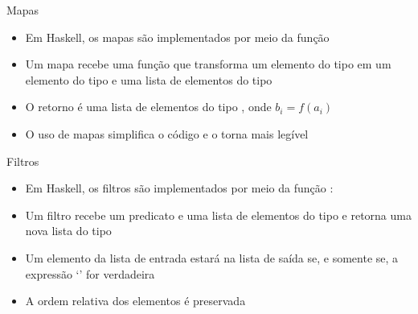 \begin{frame}[fragile]{Mapas}

    \begin{itemize}
        \item Em Haskell, os mapas são implementados por meio da função 
        
        
        \item Um mapa recebe uma função  que transforma um elemento do tipo 
             em um elemento do tipo  e uma lista de elementos
            do tipo 

        \item O retorno é uma lista de elementos do tipo , onde
            $b_i = f(a_i)$
        
        \item O uso de mapas simplifica o código e o torna mais legível
 
    \end{itemize}

\end{frame}

\begin{frame}[fragile]{Filtros}

    \begin{itemize}
        \item Em Haskell, os filtros são implementados por meio da função :


        \item Um filtro recebe um predicato  e uma lista de elementos do tipo
             e retorna uma nova lista do tipo 

        \item Um elemento  da lista de entrada estará na lista de saída
            se, e somente se, a expressão `' for verdadeira

        \item A ordem relativa dos elementos é preservada

    \end{itemize}

\end{frame}

